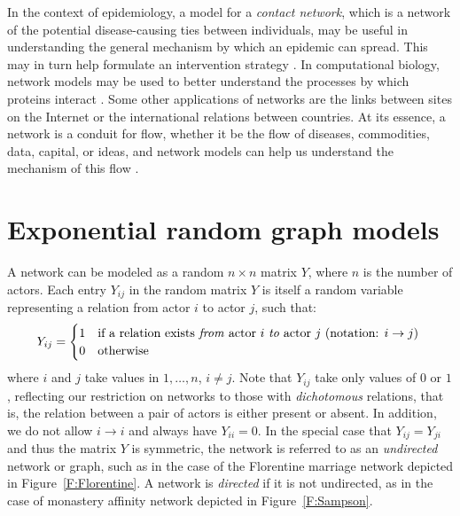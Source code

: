 In the context of epidemiology, a model for  
a \emph{contact network}, which is a network of the potential disease-causing ties between individuals, may be useful in understanding the general mechanism by which an epidemic can spread.  This may in turn help formulate an intervention strategy \citep*{Welch:2011}.
In computational biology, network models may be used to better understand the processes
by which proteins interact \citep*{Goldenberg:2009}.  
Some other applications of networks are the links between sites on the Internet
or the international relations between countries.  At its essence, 
a network is a conduit for flow, whether it be the flow of diseases, commodities, 
data, capital, or ideas, and network models can help us
 understand the mechanism of this flow \citep*{Kolaczyk:slides}.

\section{Exponential random graph models} \label{S:ERGM setup}
A network can be modeled as a random  $n \times n$ matrix $Y$, where $n$ is 
the number of actors.
Each entry $Y_{ij}$ in the random matrix $Y$ is itself a random variable representing 
a relation from actor $i$ to actor $j$, such that:
\[
	Y_{ij} = 
	\begin{cases}
		1 & \text{if a relation exists \textit{from} actor $i$ \textit{to} actor 
$j$ (notation: $i \to j$)}\\
		0 & \text{otherwise}
	\end{cases}
	\
\]
where $i$ and $j$ take values in $1, \ldots, n$, $i \neq j$.  
Note that $Y_{ij}$ take only values of $0$ or $1$, reflecting our restriction 
on networks to those with \emph{dichotomous} relations, that is, the relation between a pair 
of actors is either present or absent.  In addition, we do not allow  
$i \to i$ and always have $Y_{ii} = 0$.  In the special case that 
$Y_{ij} = Y_{ji}$ and thus the matrix $Y$ is symmetric, the network is referred to as an
\textit{undirected} network or graph, such as in the case of the Florentine marriage 
network depicted in Figure~\ref{F:Florentine}.  A network is \textit{directed} if it is 
not undirected, as in the case of monastery affinity network depicted in 
Figure~\ref{F:Sampson}.  

